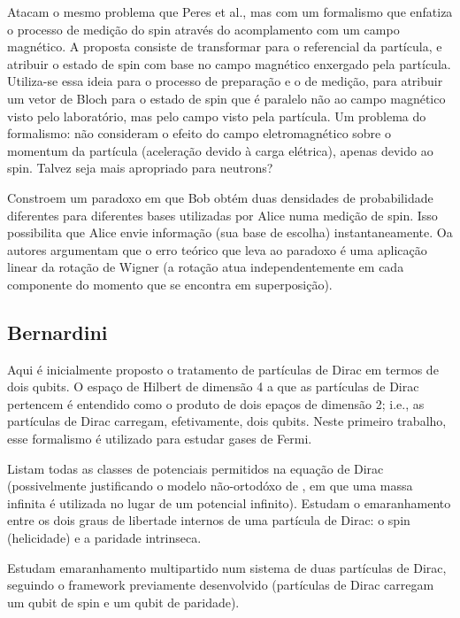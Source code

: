 \documentclass[11pt,a4paper,notitlepage]{article}
\begin{document}
\cite{saldanha_vedral_2012} Atacam o mesmo problema que Peres et al., mas com um formalismo que enfatiza o processo de medição do spin através do acomplamento com um campo magnético. A proposta consiste de transformar para o referencial da partícula, e atribuir o estado de spin com base no campo magnético enxergado pela partícula. Utiliza-se essa ideia para o processo de preparação e o de medição, para atribuir um vetor de Bloch para o estado de spin que é paralelo não ao campo magnético visto pelo laboratório, mas pelo campo visto pela partícula. Um problema do formalismo: não consideram o efeito do campo eletromagnético sobre o momentum da partícula (aceleração devido à carga elétrica), apenas devido ao spin. Talvez seja mais apropriado para neutrons?

\cite{saldanha_vedral_2013} Constroem um paradoxo em que Bob obtém duas densidades de probabilidade diferentes para diferentes bases utilizadas por Alice numa medição de spin. Isso possibilita que Alice envie informação (sua base de escolha) instantaneamente. Oa autores argumentam que o erro teórico que leva ao paradoxo é uma aplicação linear da rotação de Wigner (a rotação atua independentemente em cada componente do momento que se encontra em superposição).


\subsection*{Bernardini}

\cite{bernardini_2014} Aqui é inicialmente proposto o tratamento de partículas de Dirac em termos de dois qubits. O espaço de Hilbert de dimensão 4 a que as partículas de Dirac pertencem é entendido como o produto de dois epaços de dimensão 2; i.e., as partículas de Dirac carregam, efetivamente, dois qubits. Neste primeiro trabalho, esse formalismo é utilizado para estudar gases de Fermi.

\cite{bittencourt_2016} Listam todas as classes de potenciais permitidos na equação de Dirac (possivelmente justificando o modelo não-ortodóxo de \cite{alberto_1996}, em que uma massa infinita é utilizada no lugar de um potencial infinito). Estudam o emaranhamento entre os dois graus de libertade internos de uma partícula de Dirac: o spin (helicidade) e a paridade intrinseca.

\cite{bittencourt_2018} Estudam emaranhamento multipartido num sistema de duas partículas de Dirac, seguindo o framework previamente desenvolvido (partículas de Dirac carregam um qubit de spin e um qubit de paridade).
\end{document}

